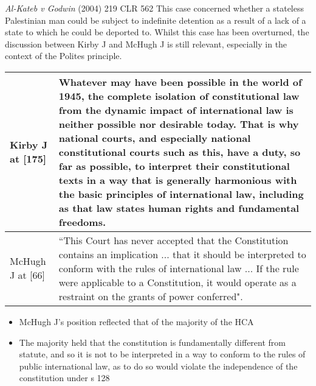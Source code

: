 \begin{casedetails}{\textit{Al-Kateb v Godwin} (2004) 219 CLR 562}
    \flushleft
    This case concerned whether a stateless Palestinian man could be subject to indefinite detention as a result of a lack of a state to which he could be deported to. Whilst this case has been overturned, the discussion between Kirby J and McHugh J is still relevant, especially in the context of the Polites principle.

    \begin{longtable}{p{}|>{\raggedright\arraybackslash}p{}}
        Kirby J at [175] & Whatever may have been possible in the world of 1945, the complete isolation of constitutional law from the dynamic impact of international law is neither possible nor desirable today. That is why national courts, and especially national constitutional courts such as this, have a duty, so far as possible, to interpret their constitutional texts in a way that is generally harmonious with the basic principles of international law, including as that law states human rights and fundamental freedoms. \\[3cm]\hline
        McHugh J at [66] & ``This Court has never accepted that the Constitution contains an implication ... that it should be interpreted to conform with the rules of international law ... If the rule were applicable to a Constitution, it would operate as a restraint on the grants of power conferred".
    \end{longtable}  
\end{casedetails}

\begin{itemize}
    \item McHugh J's position reflected that of the majority of the HCA
    \item The majority held that the constitution is fundamentally different from statute, and so it is not to be interpreted in a way to conform to the rules of public international law, as to do so would violate the independence of the constitution under s 128
\end{itemize}

